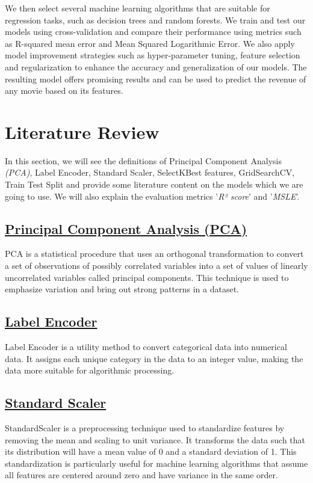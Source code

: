\documentclass[conference]{IEEEtran}
\begin{document}
        We then select several machine learning algorithms that are suitable for regression tasks, such as decision trees and random forests. We train and test our models using cross-validation and compare their performance using metrics such as R-squared mean error and Mean Squared Logarithmic Error. We also apply model improvement strategies such as hyper-parameter tuning, feature selection and regularization to enhance the accuracy and generalization of our models. The resulting model offers promising results and can be used to predict the revenue of any movie based on its features.

\section{Literature Review}
    In this section, we will see the definitions of Principal Component Analysis \textit{(PCA)}, Label Encoder, Standard Scaler, SelectKBest features, GridSearchCV, Train Test Split and provide some literature content on the models which we are going to use. We will also explain the evaluation metrics '\textit{R² score}' and '\textit{MSLE}'.
    
    \subsection*{\href{https://en.wikipedia.org/wiki/Principal_component_analysis}{Principal Component Analysis (PCA)}}
    PCA is a statistical procedure that uses an orthogonal transformation to convert a set of observations of possibly correlated variables into a set of values of linearly uncorrelated variables called principal components. This technique is used to emphasize variation and bring out strong patterns in a dataset.
    
    \subsection*{\href{https://scikit-learn.org/stable/modules/generated/sklearn.preprocessing.LabelEncoder.html}{Label Encoder}}
    Label Encoder is a utility method to convert categorical data into numerical data. It assigns each unique category in the data to an integer value, making the data more suitable for algorithmic processing.

    \subsection*{\href{https://scikit-learn.org/stable/modules/generated/sklearn.preprocessing.StandardScaler.html}{Standard Scaler}}
    StandardScaler is a preprocessing technique used to standardize features by removing the mean and scaling to unit variance. It transforms the data such that its distribution will have a mean value of 0 and a standard deviation of 1. This standardization is particularly useful for machine learning algorithms that assume all features are centered around zero and have variance in the same order.
    
\end{document}
